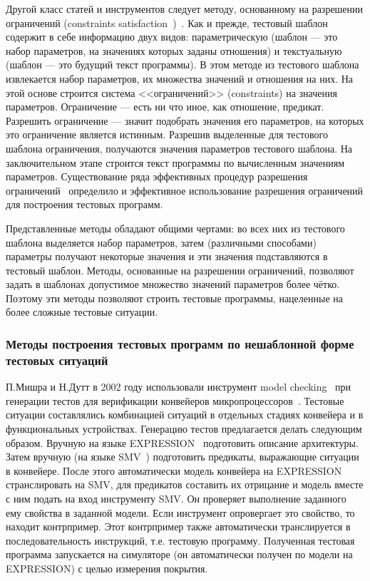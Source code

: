 
Другой класс статей и инструментов следует методу, основанному на разрешении ограничений (constraints satisfaction~\cite{CLPusingECLiPSe})~\cite{GenesysPro, GenesysPro2004Innovations, DeepTrans, RAVEN, MAATG}. Как и прежде, тестовый шаблон содержит в себе информацию двух видов: параметрическую (шаблон --- это набор параметров, на значениях которых заданы отношения) и текстуальную (шаблон --- это будущий текст программы). В этом методе из тестового шаблона извлекается набор параметров, их множества значений и отношения на них. На этой основе строится система <<ограничений>> (constraints) на значения параметров. Ограничение --- есть ни что иное, как отношение, предикат. Разрешить ограничение --- значит подобрать значения его параметров, на которых это ограничение является истинным. Разрешив выделенные для тестового шаблона ограничения, получаются значения параметров тестового шаблона. На заключительном этапе строится текст программы по вычисленным значениям параметров. Существование ряда эффективных процедур разрешения ограничений~\cite{CLPusingECLiPSe, SMT} определило и эффективное использование разрешения ограничений для построения тестовых программ.

Представленные методы обладают общими чертами: во всех них из тестового шаблона выделяется набор параметров, затем (различными способами) параметры получают некоторые значения и эти значения подставляются в тестовый шаблон. Методы, основанные на разрешении ограничений, позволяют задать в шаблонах допустимое множество значений параметров более чётко. Поэтому эти методы позволяют строить тестовые программы, нацеленные на более сложные тестовые ситуации.

\subsubsection{Методы построения тестовых программ по нешаблонной форме тестовых ситуаций}%

П.Мишра и Н.Дутт в 2002 году использовали инструмент model checking~\cite{ModelChecking} при генерации тестов для верификации конвейеров микропроцессоров~\cite{MishraDutt02}. Тестовые ситуации составлялись комбинацией ситуаций в отдельных стадиях конвейера и в функциональных устройствах. Генерацию тестов предлагается делать следующим образом. Вручную на языке EXPRESSION~\cite{EXPRESSION} подготовить описание архитектуры. Затем вручную (на языке SMV~\cite{SMV}) подготовить предикаты, выражающие ситуации в конвейере. После этого автоматически модель конвейера на EXPRESSION странслировать на SMV, для предикатов составить их отрицание и модель вместе с ним подать на вход инструменту SMV. Он проверяет выполнение заданного ему свойства в заданной модели. Если инструмент опровергает это свойство, то находит контрпример. Этот контрпример также автоматически транслируется в последовательность инструкций, т.е. тестовую программу. Полученная тестовая программа запускается на симуляторе (он автоматически получен по модели на EXPRESSION) с целью измерения покрытия.

